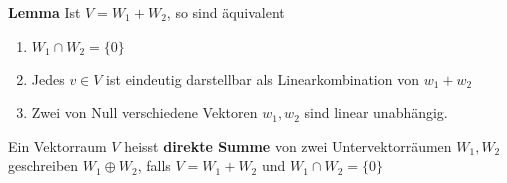 \newpage
\textbf{Lemma} Ist $V = W_1 + W_2$, so sind äquivalent
\begin{enumerate}[{(}a{)}]
    \item   $W_1 \cap W_2  = \{0\}$ 
    
    \item   Jedes $v \in V$ ist eindeutig darstellbar als Linearkombination von $w_1 + w_2$
    
    \item   Zwei von Null verschiedene Vektoren $w_1, w_2$ sind linear unabhängig.
\end{enumerate}
\begin{mdframed}
Ein Vektorraum $V$ heisst \textbf{direkte Summe} von zwei Untervektorräumen $W_1, W_2$ geschreiben $W_1 \oplus W_2$, falls $V = W_1 + W_2$ und $W_1 \cap W_2 = \{0\}$
\end{mdframed}

